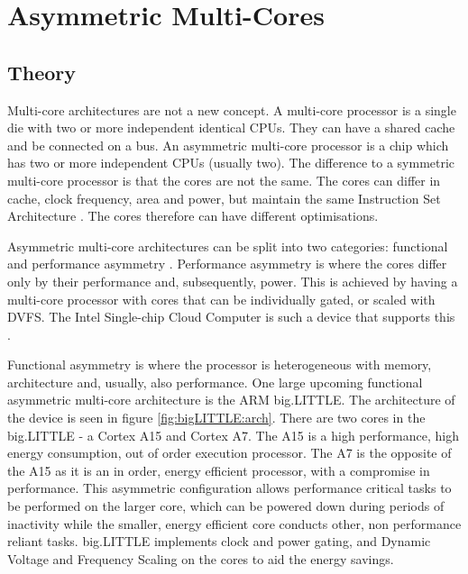 
\section{Asymmetric Multi-Cores}

\subsection{Theory}
Multi-core architectures are not a new concept. 
A multi-core processor is a single die with two or more independent identical CPUs. 
They can have a shared cache and be connected on a bus.
An asymmetric multi-core processor is a chip which has two or more independent CPUs (usually two).
The difference to a symmetric multi-core processor is that the cores are not the same. 
The cores can differ in cache, clock frequency, area and power, but maintain the same Instruction Set Architecture \cite{de2012power}.
The cores therefore can have different optimisations.


Asymmetric multi-core architectures can be split into two categories: functional and performance asymmetry \cite{wang2012energy}.
Performance asymmetry is where the cores differ only by their performance and, subsequently, power. 
This is achieved by having a multi-core processor with cores that can be individually gated, or scaled with DVFS.
The Intel Single-chip Cloud Computer is such a device that supports this \cite{IntelSCC}.

Functional asymmetry is where the processor is heterogeneous with memory, architecture and, usually, also performance.
One large upcoming functional asymmetric multi-core architecture is the ARM big.LITTLE. 
The architecture of the device is seen in figure \ref{fig:bigLITTLE:arch}.
There are two cores in the big.LITTLE - a Cortex A15 and Cortex A7.
The A15 is a high performance, high energy consumption, out of order execution processor. %
The A7 is the opposite of the A15 as it is an in order, energy efficient processor, with a compromise in performance. 
This asymmetric configuration allows performance critical tasks to be performed on the larger core, which can be powered down during periods of inactivity while the smaller, energy efficient core conducts other, non performance reliant tasks.
big.LITTLE implements clock and power gating, and Dynamic Voltage and Frequency Scaling on the cores to aid the energy savings.


